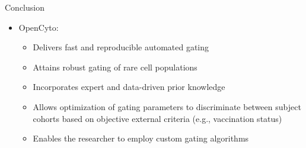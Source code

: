 \documentclass[final,t]{beamer}
\begin{document}
\begin{frame}{}
\begin{columns}[t]
\begin{column}{.3\linewidth}

      \begin{block}{Conclusion}
        \begin{itemize}
            \item OpenCyto:
    \begin{itemize}
    \item Delivers \alert{fast} and \alert{reproducible} automated gating
    \item Attains \alert{robust} gating of rare cell populations
    \item Incorporates \alert{expert} and \alert{data-driven} prior knowledge
    \item Allows optimization of gating parameters to discriminate between subject cohorts based on objective external criteria (e.g., vaccination status)
    \item Enables the researcher to employ \alert{custom} gating algorithms
    \end{itemize}
        \end{itemize}
        \vspace{-1ex}
      \end{block}



\end{column}
\end{columns}
\end{frame}
\end{document}
